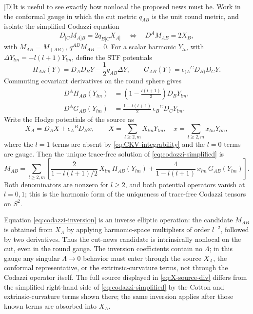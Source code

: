 \documentclass[11pt,a4paper]{article}
\newcommand{\statusD}{\textsf{[D]}}
\begin{document}
\statusD It is useful to see exactly how nonlocal the proposed news must be.  Work in the conformal gauge in which the cut metric \(q_{AB}\) is the unit round metric, and isolate the simplified Codazzi equation
\begin{equation}\label{eq:codazzi-simplified}
  D_{[C}M_{A]B}=2q_{B[C}X_{A]}
  \quad\Longleftrightarrow\quad
  D^A M_{AB}=2X_B ,
\end{equation}
with \(M_{AB}=M_{(AB)}\), \(q^{AB}M_{AB}=0\).  For a scalar harmonic \(Y_{lm}\) with \(\Delta Y_{lm}=-l(l+1)Y_{lm}\), define the STF potentials
\begin{equation}
  H_{AB}(Y)=D_AD_BY-\frac12q_{AB}\Delta Y,
  \qquad
  G_{AB}(Y)=\epsilon_{(A}{}^{C}D_{B)}D_CY .
\end{equation}
Commuting covariant derivatives on the round sphere gives
\begin{align}
  D^A H_{AB}(Y_{lm})
  &=
  \left(1-\frac{l(l+1)}2\right)D_BY_{lm},\\
  D^A G_{AB}(Y_{lm})
  &=
  \frac{1-l(l+1)}2\,\epsilon_B{}^C D_CY_{lm}.
\end{align}
Write the Hodge potentials of the source as
\begin{equation}
  X_A=D_AX+\epsilon_A{}^B D_Bx,
  \qquad
  X=\sum_{l\ge2,m}X_{lm}Y_{lm},
  \quad
  x=\sum_{l\ge2,m}x_{lm}Y_{lm},
\end{equation}
where the \(l=1\) terms are absent by \eqref{eq:CKV-integrability} and the \(l=0\) terms are gauge.  Then the unique trace-free solution of \eqref{eq:codazzi-simplified} is
\begin{equation}\label{eq:codazzi-inversion}
  M_{AB}
  =
  \sum_{l\ge2,m}
  \left[
    \frac{2}{1-l(l+1)/2}\,X_{lm}\,H_{AB}(Y_{lm})
    +
    \frac{4}{1-l(l+1)}\,x_{lm}\,G_{AB}(Y_{lm})
  \right].
\end{equation}
Both denominators are nonzero for \(l\ge2\), and both potential operators vanish at \(l=0,1\); this is the harmonic form of the uniqueness of trace-free Codazzi tensors on \(S^2\).

Equation \eqref{eq:codazzi-inversion} is an inverse elliptic operation: the candidate \(M_{AB}\) is obtained from \(X_A\) by applying harmonic-space multipliers of order \(l^{-2}\), followed by two derivatives.  Thus the cut-news candidate is intrinsically nonlocal on the cut, even in the round gauge.  The inversion coefficients contain no \(\Lambda\); in this gauge any singular \(\Lambda\to0\) behavior must enter through the source \(X_A\), the conformal representative, or the extrinsic-curvature terms, not through the Codazzi operator itself.  The full source displayed in \eqref{eq:X-source-div} differs from the simplified right-hand side of \eqref{eq:codazzi-simplified} by the Cotton and extrinsic-curvature terms shown there; the same inversion applies after those known terms are absorbed into \(X_A\).
\end{document}
